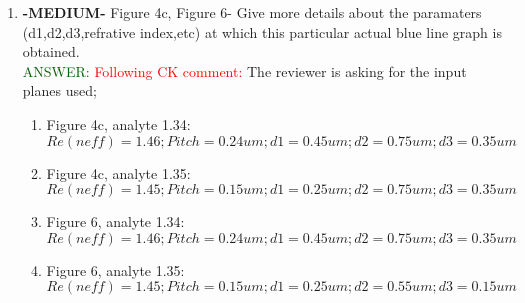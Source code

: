 \documentclass{article}
\begin{document}
\begin{enumerate}
\item \textbf{-MEDIUM-} Figure 4c, Figure 6- Give more details about the paramaters (d1,d2,d3,refrative index,etc) at which this particular actual blue line graph is obtained.\\
\textcolor{darkgreen}{ANSWER: } \textcolor{red}{Following CK comment: } The reviewer is asking for the input planes used; \\
\begin{enumerate}
\item Figure 4c, analyte 1.34: \\
$Re(neff) = 1.46; Pitch = 0.24 um ; d1 = 0.45 um; d2= 0.75um; d3 = 0.35um $ \\
\item Figure 4c, analyte 1.35: \\
$Re(neff) = 1.45; Pitch = 0.15 um ; d1 = 0.25 um; d2= 0.75um; d3 = 0.35um $ \\
\item Figure 6, analyte 1.34: \\
$Re(neff) = 1.46; Pitch = 0.24 um ; d1 = 0.45 um; d2= 0.75um; d3 = 0.35um $ \\
\item Figure 6, analyte 1.35: \\
$Re(neff) = 1.45; Pitch = 0.15 um ; d1 = 0.25 um; d2= 0.55um; d3 = 0.15um $ \\

\end{enumerate} 


\end{enumerate}
\end{document}
